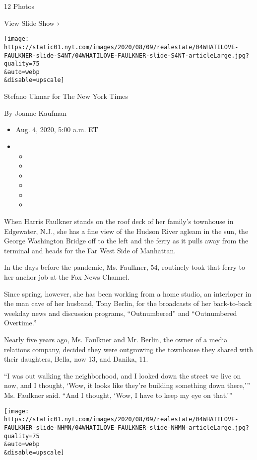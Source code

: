 12 Photos

View Slide Show ›

\texttt{[image: https://static01.nyt.com/images/2020/08/09/realestate/04WHATILOVE-FAULKNER-slide-S4NT/04WHATILOVE-FAULKNER-slide-S4NT-articleLarge.jpg?quality=75\\\&auto=webp\\\&disable=upscale]}

Stefano Ukmar for The New York Times

By Joanne Kaufman

\begin{itemize}
\item
  Aug. 4, 2020, 5:00 a.m. ET
\item
  \begin{itemize}
  \item
  \item
  \item
  \item
  \item
  \item
  \end{itemize}
\end{itemize}

When Harris Faulkner stands on the roof deck of her family's townhouse
in Edgewater, N.J., she has a fine view of the Hudson River agleam in
the sun, the George Washington Bridge off to the left and the ferry as
it pulls away from the terminal and heads for the Far West Side of
Manhattan.

In the days before the pandemic, Ms. Faulkner, 54, routinely took that
ferry to her anchor job at the Fox News Channel.

Since spring, however, she has been working from a home studio, an
interloper in the man cave of her husband, Tony Berlin, for the
broadcasts of her back-to-back weekday news and discussion programs,
``Outnumbered'' and ``Outnumbered Overtime.''

Nearly five years ago, Ms. Faulkner and Mr. Berlin, the owner of a media
relations company, decided they were outgrowing the townhouse they
shared with their daughters, Bella, now 13, and Danika, 11.

``I was out walking the neighborhood, and I looked down the street we
live on now, and I thought, `Wow, it looks like they're building
something down there,''' Ms. Faulkner said. ``And I thought, `Wow, I
have to keep my eye on that.'''

\texttt{[image: https://static01.nyt.com/images/2020/08/09/realestate/04WHATILOVE-FAULKNER-slide-NHMN/04WHATILOVE-FAULKNER-slide-NHMN-articleLarge.jpg?quality=75\\\&auto=webp\\\&disable=upscale]}

